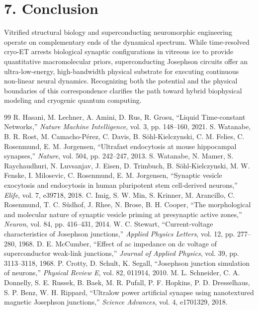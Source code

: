 \documentclass[10pt,twocolumn,letterpaper]{article}
\begin{document}
\section*{7. Conclusion}

Vitrified structural biology and superconducting neuromorphic engineering operate on complementary ends of the dynamical spectrum. While time-resolved cryo-ET arrests biological synaptic configurations in vitreous ice to provide quantitative macromolecular priors, superconducting Josephson circuits offer an ultra-low-energy, high-bandwidth physical substrate for executing continuous non-linear neural dynamics. Recognizing both the potential and the physical boundaries of this correspondence clarifies the path toward hybrid biophysical modeling and cryogenic quantum computing.

\footnotesize
\begin{thebibliography}{99}
\setlength{\itemsep}{-0.5pt}
\setlength{\parskip}{0pt}
 R. Hasani, M. Lechner, A. Amini, D. Rus, R. Grosu, ``Liquid Time-constant Networks,'' \textit{Nature Machine Intelligence}, vol. 3, pp. 148--160, 2021.
 S. Watanabe, B. R. Rost, M. Camacho-P{\'e}rez, C. Davis, B. S{\"o}hl-Kielczynski, C. M. Felies, C. Rosenmund, E. M. Jorgensen, ``Ultrafast endocytosis at mouse hippocampal synapses,'' \textit{Nature}, vol. 504, pp. 242--247, 2013.
 S. Watanabe, N. Mamer, S. Raychaudhuri, N. Luvsanjav, J. Eisen, D. Trimbuch, B. S{\"o}hl-Kielczynski, M. W. Fenske, I. Milosevic, C. Rosenmund, E. M. Jorgensen, ``Synaptic vesicle exocytosis and endocytosis in human pluripotent stem cell-derived neurons,'' \textit{Elife}, vol. 7, e39718, 2018.
 C. Imig, S. W. Min, S. Krinner, M. Arancillo, C. Rosenmund, T. C. S{\"u}dhof, J. Rhee, N. Brose, B. H. Cooper, ``The morphological and molecular nature of synaptic vesicle priming at presynaptic active zones,'' \textit{Neuron}, vol. 84, pp. 416--431, 2014.
 W. C. Stewart, ``Current-voltage characteristics of Josephson junctions,'' \textit{Applied Physics Letters}, vol. 12, pp. 277--280, 1968.
 D. E. McCumber, ``Effect of ac impedance on dc voltage of superconductor weak-link junctions,'' \textit{Journal of Applied Physics}, vol. 39, pp. 3113--3118, 1968.
 P. Crotty, D. Schult, K. Segall, ``Josephson junction simulation of neurons,'' \textit{Physical Review E}, vol. 82, 011914, 2010.
 M. L. Schneider, C. A. Donnelly, S. E. Russek, B. Baek, M. R. Pufall, P. F. Hopkins, P. D. Dresselhaus, S. P. Benz, W. H. Rippard, ``Ultralow power artificial synapse using nanotextured magnetic Josephson junctions,'' \textit{Science Advances}, vol. 4, e1701329, 2018.

\end{thebibliography}
\end{document}
